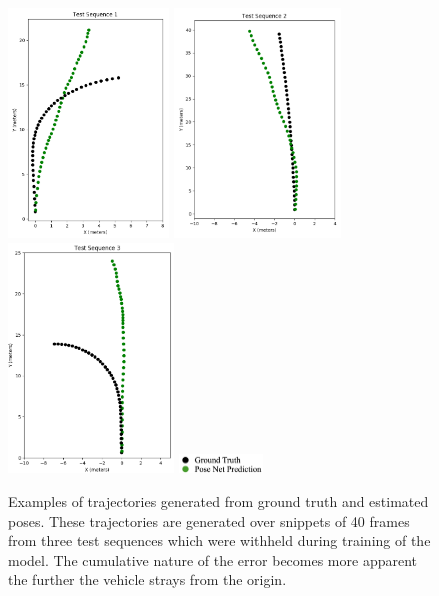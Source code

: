 \begin{figure}[htbp]
    \centering
    \includegraphics[height=2.4in]{images/vo_results/0034.png}
    \includegraphics[height=2.4in]{images/vo_results/0018.png}
    \includegraphics[height=2.4in]{images/vo_results/0027.png}
    \includegraphics[height=0.2in]{images/vo_results/legend.png}

    \caption{Examples of trajectories generated from ground truth and estimated poses. These trajectories are generated over snippets of 40 frames from three test sequences which were withheld during training of the model. The cumulative nature of the error becomes more apparent the further the vehicle strays from the origin.}

    \label{vo_results_kitti}
    
\end{figure}

